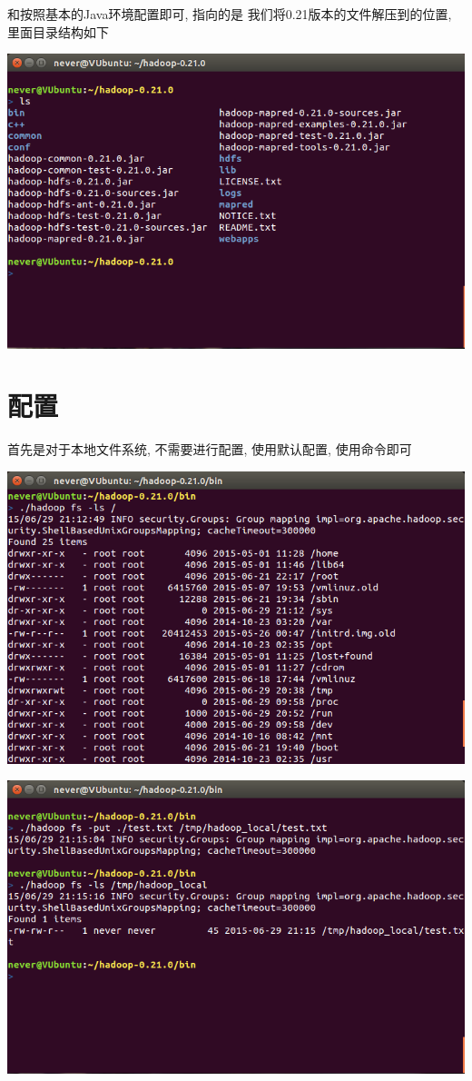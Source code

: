 {\JH}和{\CPATH}按照基本的Java环境配置即可, {\HHOME}指向的是
我们将{\Hadoop}0.21版本的文件解压到的位置, 里面目录结构如下

\includegraphics[width=\textwidth]{image/env/cr6.png}

\section{{\Hadoop}配置}

首先是对于本地文件系统, {\Hadoop}不需要进行配置, 使用默认配置,
使用命令即可

\includegraphics[width=\textwidth]{image/env/cr7.png}

\includegraphics[width=\textwidth]{image/env/cr8.png}

